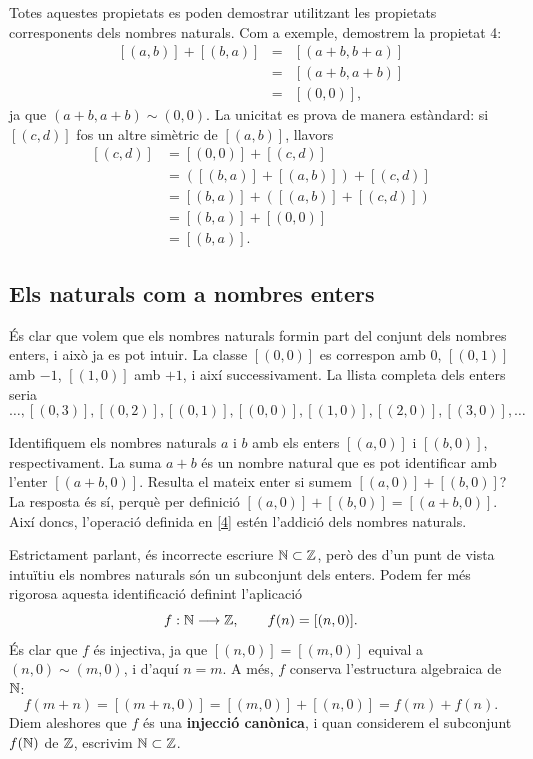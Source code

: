 \begin{prova}
Totes aquestes propietats es poden demostrar utilitzant les propietats corresponents dels nombres naturals. Com a exemple, demostrem la propietat 4:
\[
\begin{array}{lll}
[(a,b)]+[(b,a)] &=& [(a+b,b+a)]\\
&=& [(a+b,a+b)]\\
&=& [(0,0)],
\end{array}
\]
ja que $(a+b,a+b)\sim (0,0)$. La unicitat es prova de manera estàndard: si $[(c,d)]$ fos un altre simètric de $[(a,b)]$, llavors
\[
\begin{aligned}
[(c,d)]
&=[(0,0)]+[(c,d)]\\
&=([(b,a)]+[(a,b)])+[(c,d)]\\
&=[(b,a)]+([(a,b)]+[(c,d)])\\
&=[(b,a)]+[(0,0)]\\
&=[(b,a)].
\end{aligned}
\]
\end{prova}

\subsection{Els naturals com a nombres enters}\label{7}

És clar que volem que els nombres naturals formin part del conjunt dels nombres enters, i això ja es pot intuir. La classe $[(0,0)]$ es correspon amb $0$, $[(0,1)]$ amb $-1$, $[(1,0)]$ amb $+1$, i així successivament. La llista completa dels enters seria
\[
\ldots,[(0,3)],[(0,2)],[(0,1)],[(0,0)],[(1,0)],[(2,0)],[(3,0)],\ldots
\]

Identifiquem els nombres naturals $a$ i $b$ amb els enters $[(a,0)]$ i $[(b,0)]$, respectivament. La suma $a+b$ és un nombre natural que es pot identificar amb l'enter $[(a+b,0)]$. Resulta el mateix enter si sumem $[(a,0)]+[(b,0)]$? La resposta és sí, perquè per definició $[(a,0)]+[(b,0)]=[(a+b,0)]$. Així doncs, l'operació definida en \eqref{4} estén l'addició dels nombres naturals.

Estrictament parlant, és incorrecte escriure $\mathbb{N}\subset \mathbb{Z}$, però des d'un punt de vista intuïtiu els nombres naturals són un subconjunt dels enters. Podem fer més rigorosa aquesta identificació definint l'aplicació
\[
f:\mathbb{N}\longrightarrow \mathbb{Z},\qquad f(n)=[(n,0)].
\]
És clar que $f$ és injectiva, ja que $[(n,0)]=[(m,0)]$ equival a $(n,0)\sim (m,0)$, i d'aquí $n=m$. A més, $f$ conserva l'estructura algebraica de $\mathbb{N}$:
\[
f(m+n)=[(m+n,0)]=[(m,0)]+[(n,0)]=f(m)+f(n).
\]
Diem aleshores que $f$ és una \textbf{injecció canònica}, i quan considerem el subconjunt $f(\mathbb{N})$ de $\mathbb{Z}$, escrivim $\mathbb{N}\subset \mathbb{Z}$.


